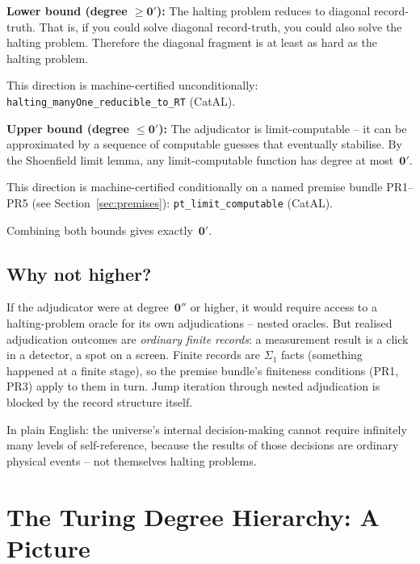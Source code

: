 \documentclass[11pt,a4paper]{article}
\newcommand{\lean}[1]{\texttt{#1}}
\newcommand{\zerp}{\mathbf{0}'}
\newcommand{\zerpp}{\mathbf{0}''}
\begin{document}
\medskip
\noindent\textbf{Lower bound (degree $\geq \zerp$):} The halting problem
reduces to diagonal record-truth.  That is, if you could solve diagonal
record-truth, you could also solve the halting problem.  Therefore the
diagonal fragment is at least as hard as the halting problem.

This direction is machine-certified unconditionally:
\lean{halting\_manyOne\_reducible\_to\_RT} (CatAL).

\medskip
\noindent\textbf{Upper bound (degree $\leq \zerp$):} The adjudicator is
limit-computable -- it can be approximated by a sequence of computable
guesses that eventually stabilise.  By the Shoenfield limit lemma, any
limit-computable function has degree at most~$\zerp$.

This direction is machine-certified conditionally on a named premise bundle
PR1--PR5 (see Section~\ref{sec:premises}):
\lean{pt\_limit\_computable} (CatAL).

\medskip
\noindent Combining both bounds gives exactly~$\zerp$.

\subsection{Why not higher?}

If the adjudicator were at degree~$\zerpp$ or higher, it would require
access to a halting-problem oracle for its own adjudications -- nested
oracles.  But realised adjudication outcomes are \emph{ordinary finite
records}: a measurement result is a click in a detector, a spot on a
screen.  Finite records are $\Sigma_1$ facts (something happened at a
finite stage), so the premise bundle's finiteness conditions (PR1, PR3)
apply to them in turn.  Jump iteration through nested adjudication is
blocked by the record structure itself.

In plain English: the universe's internal decision-making cannot require
infinitely many levels of self-reference, because the results of those
decisions are ordinary physical events -- not themselves halting problems.

\section{The Turing Degree Hierarchy: A Picture}
\label{sec:picture}
\end{document}
